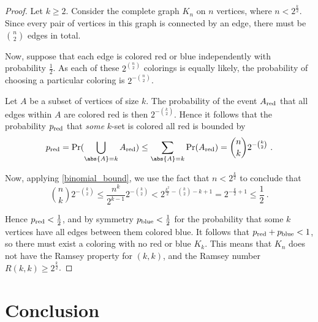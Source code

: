 \documentclass{article}
\begin{document}
\begin{proof}
    Let $k \geq 2$. Consider the complete graph $K_n$ on $n$ vertices, where $n < 2^{\frac k 2}$. Since every pair of vertices in this graph is connected by an edge, there must be $n \choose 2$ edges in total.

    Now, suppose that each edge is colored red or blue independently with probability $\frac 1 2$. As each of these $2^{n \choose 2}$ colorings is equally likely, the probability of choosing a particular coloring is $2^{-{n \choose 2}}$.

    Let $A$ be a subset of vertices of size $k$. The probability of the event $A_{\mathrm{red}}$ that all edges within $A$ are colored red is then $2^{-{k \choose 2}}$. Hence it follows that the probability $p_{\mathrm{red}}$ that \emph{some} $k$-set is colored all red is bounded by
    \[
        p_\red = \Pr(\bigcup_{\abs{A} = k} A_\red)
        \leq \sum_{\abs{A} = k} \Pr(A_\red)
        = {n \choose k} 2^{-{k \choose 2}} \ .
    \]

Now, applying \cref{binomial_bound}, we use the fact that $n < 2^{\frac k 2}$ to conclude that
    \[
        {n \choose k} 2^{-{k \choose 2}}
        \leq \frac{n^k}{2^{k-1}} 2^{-{k \choose 2}}
        < 2^{\frac{k^2}{2} - {k \choose 2} - k + 1}
        = 2^{-\frac k 2 + 1}
        \leq \frac 1 2 \ .
    \]

Hence $p_{\mathrm{red}} < \frac 1 2$, and by symmetry $p_{\mathrm{blue}} < \frac 1 2$ for the probability that some $k$ vertices have all edges between them colored blue. It follows that $p_{\mathrm{red}} + p_{\mathrm{blue}} < 1$, so there must exist a coloring with no red or blue $K_k$. This means that $K_n$ does not have the Ramsey property for $(k, k)$, and the Ramsey number $R(k,k) \geq 2^{\frac k 2}$.
\end{proof}

\section{Conclusion}


\listoftodos



\end{document}
